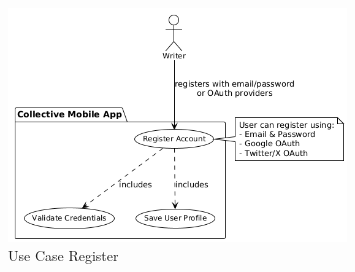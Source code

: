 \begin{figure}[H]
\centering
\includegraphics[width=0.8\textwidth]{files/imgs/usecase_U9ojKajF0Z.png}
\caption{Use Case Register}
\label{fig:usecase-register}
\end{figure}

